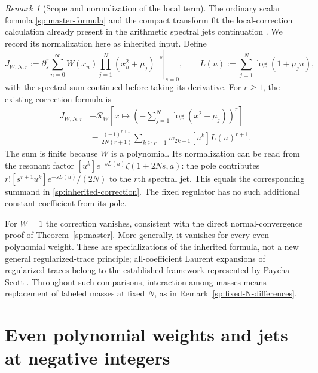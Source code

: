 \documentclass[11pt,letterpaper]{article}
\numberwithin{equation}{section}
\theoremstyle{definition}
\theoremstyle{remark}
\newtheorem{remark}[theorem]{Remark}
\begin{document}
\begin{remark}[Scope and normalization of the local term]
\label{sp:inherited-local-correction}
The ordinary scalar formula \eqref{sp:master-formula} and the
compact transform fit the local-correction calculation already
present in the arithmetic spectral jets continuation
\cite{ProveItArithmeticJets}.  We record its normalization here
as inherited input.  Define
\[
 J_{W,N,r}:=\left.\partial_s^r
       \sum_{n=0}^{\infty}W(x_n)
                     \prod_{j=1}^{N}(x_n^2+\mu_j)^{-s}
                    \right|_{s=0},\qquad
 L(u):=\sum_{j=1}^{N}\log(1+\mu_j u),
\]
with the spectral sum continued before taking its derivative.
For $r\geq1$, the existing correction formula is
\begin{equation}
 \begin{split}
 J_{W,N,r}
 &-\mathcal R_W\left[
        x\longmapsto\left(-\sum_{j=1}^{N}\log(x^2+\mu_j)\right)^r
                   \right]\\
 &=\frac{(-1)^{r+1}}{2N(r+1)}
     \sum_{k\geq r+1}w_{2k-1}[u^k]L(u)^{r+1}.
 \end{split}
 \label{sp:inherited-correction}
\end{equation}
The sum is finite because $W$ is a polynomial.  Its normalization
can be read from the resonant factor
$[u^k]e^{-sL(u)}\zeta(1+2Ns,a)$: the pole contributes
$r![s^{r+1}u^k]e^{-sL(u)}/(2N)$ to the $r$th spectral jet.
This equals the corresponding summand in
\eqref{sp:inherited-correction}.  The fixed regulator has no
such additional constant coefficient from its pole.

For $W=1$ the correction vanishes, consistent with the direct
normal-convergence proof of Theorem~\ref{sp:master}.
More generally, it vanishes for every even polynomial weight.
These are specializations of the inherited formula, not a new
general regularized-trace principle; all-coefficient Laurent
expansions of regularized traces belong to the established
framework represented by Paycha--Scott \cite{PaychaScott}.
Throughout such comparisons, interaction among masses means
replacement of labeled masses at fixed $N$, as in
Remark~\ref{sp:fixed-N-differences}.
\end{remark}




\section{Even polynomial weights and jets at negative integers}
\label{ng:section}
\end{document}
